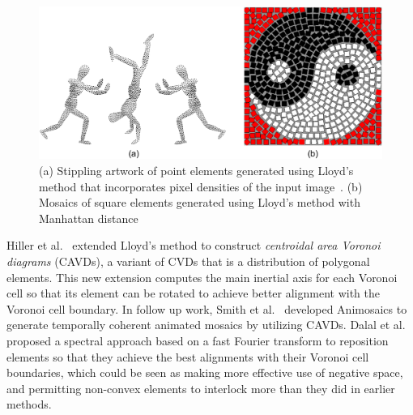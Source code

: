 \begin{figure}
\centering
\includegraphics[width=1.0\textwidth]{figures/related/secord_hausner.pdf} 
\caption[Stippling artwork and traditional mosaics]
{\label{fig_related_secord_hausner} 
\nnewtext
{
(a) Stippling artwork of point elements generated using Lloyd's method 
that incorporates pixel densities of the input image~\cite{Secord2002}.
(b) Mosaics of square elements generated using Lloyd's method with Manhattan distance~\cite{Hausner2001}
}
}
\end{figure}

\newtext
{Hiller et al.~\cite{Hiller2003} extended Lloyd's method to construct \textit{centroidal area Voronoi diagrams} (CAVDs),
a variant of CVDs that is a distribution of polygonal elements.
This new extension computes the main inertial axis for each Voronoi cell so that 
its element can be rotated to achieve better alignment with the Voronoi cell boundary.
In follow up work, Smith et al.~\cite{Smith2005} developed Animosaics to generate temporally coherent animated mosaics by utilizing CAVDs.
Dalal et al.~\cite{Dalal2006} proposed a spectral approach based on a fast Fourier transform to reposition
elements so that they achieve the best alignments with their Voronoi cell boundaries, 
which could be seen as making more effective use of negative
space, and permitting non-convex elements to interlock more than they did in
earlier methods.}

